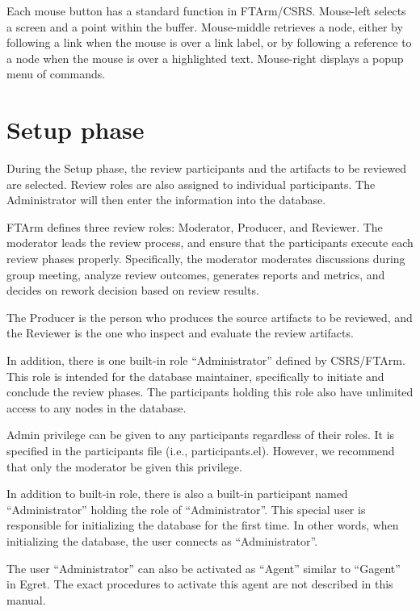 Each mouse button has a standard function in FTArm/CSRS. Mouse-left
selects a screen and a point within the buffer. Mouse-middle retrieves
a node, either by following a link when the mouse is over a link
label, or by following a reference to a node when the mouse is over a
highlighted text. Mouse-right displays a popup menu of commands. 


\section {Setup phase}
During the Setup phase, the review participants and the artifacts
to be reviewed are selected. Review roles are also assigned to
individual participants. The Administrator will then enter the
information into the database.

FTArm defines three review roles: Moderator, Producer, 
and Reviewer. The moderator leads the review process, and ensure that
the participants execute each review phases properly. Specifically, the 
moderator moderates discussions during group meeting, analyze review 
outcomes, generates reports and metrics, and 
decides on rework decision based on review results.

The Producer is the person who produces the source artifacts to be 
reviewed, and the Reviewer is the one who inspect and evaluate the
review artifacts.

In addition, there is one built-in role ``Administrator'' defined by 
CSRS/FTArm. This role is intended for the
database maintainer, specifically to initiate and conclude the
review phases. The participants holding this role also have
unlimited access to any nodes in the database.

Admin privilege can be given to any participants regardless of their
roles. It is specified in the participants file (i.e., participants.el).
However, we recommend that only the moderator be given this
privilege. 

In addition to built-in role, there is also a built-in participant
named ``Administrator'' holding the role of ``Administrator''. This
special user is responsible 
for initializing the database for the first time. In other words, when
initializing the database, the user connects as ``Administrator''. 

The user ``Administrator'' can also be activated as ``Agent'' similar
to ``Gagent'' in Egret. The exact procedures to activate this agent
are not described in this manual.


